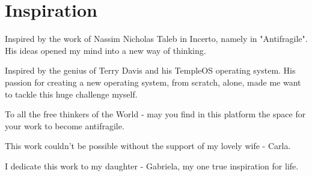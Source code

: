 \section{Inspiration}
Inspired by the work of Nassim Nicholas Taleb in Incerto, namely in "Antifragile". His ideas opened my mind into a new way of thinking. 

Inspired by the genius of Terry Davis and his TempleOS operating system. His passion for creating a new operating system, from scratch, alone, made me want to tackle this huge challenge myself.

To all the free thinkers of the World - may you find in this platform the space for your work to become antifragile.

This work couldn't be possible without the support of my lovely wife - Carla.

I dedicate this work to my daughter - Gabriela, my one true inspiration for life.